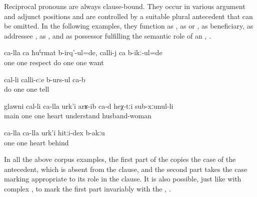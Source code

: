 Reciprocal pronouns are always clause-bound. They occur in various argument and adjunct positions and are controlled by a suitable plural antecedent that can be omitted. In the following examples, they function as  , as  or  , as beneficiary, as addressee , as  , and as  possessor fulfilling the semantic role of an  , . 
%
\begin{exe}
	\ex	\label{ex:‎They respected each other, loved each other}
	\gll	ca-lla	ca	ħuˁrmat	b-irq'-ul=de,	calli-j	ca	b-ikː-ul=de\\
		one	one	respect	do	one	one	want\\
	\glt	{}

	\ex	\label{ex:‎‎They talk to each other what they would do}
	\gll	[b-arq'-ib=el]	cal-li	calli-cːe	b-urs-ul	ca-b\\
		do	one	one	tell	\\
	\glt	{}

	\ex	\label{ex:‎The main point is that they understand each other, the couple}
	\gll	glawni	cal-li	ca-lla	urk'i	arʁ-ib	ca-d	heχ-tːi	sub-xːunul-li\\
		main	one	one	heart	understand			husband-woman\\
	\glt	{}

	\ex	\label{ex:There no bad feelings between each other}
	\gll	ca-lla	ca-lla	urk'i	hitːi-dex	b-akːu\\
		one	one	heart	behind	\\
	\glt	{} 
\end{exe}

In all the above corpus examples, the first part of the  copies the case of the antecedent, which is absent from the clause, and the second part takes the case marking appropriate to its role in the clause. It is also possible, just like with complex , to mark the first part invariably with the  , .

